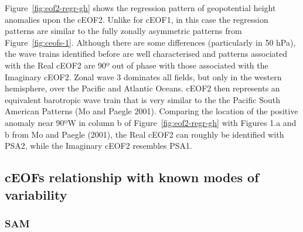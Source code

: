 \documentclass[smallextended]{svjour3}       %
\begin{document}
Figure~\ref{fig:eof2-regr-gh} shows the regression pattern of geopotential height anomalies upon the cEOF2. Unlike for cEOF1, in this case the regression patterns are similar to the fully zonally asymmetric patterns from Figure~\ref{fig:ceofs-1}. Although there are some differences (particularly in 50 hPa), the wave trains identified before are well characterised and patterns associated with the Real cEOF2 are 90º out of phase with those associated with the Imaginary cEOF2. Zonal wave 3 dominates all fields, but only in the western hemisphere, over the Pacific and Atlantic Oceans. cEOF2 then represents an equivalent barotropic wave train that is very similar to the the Pacific South American Patterns (Mo and Paegle 2001).
Comparing the location of the positive anomaly near 90ºW in column b of Figure~\ref{fig:eof2-regr-gh} with Figures 1.a and b from Mo and Paegle (2001), the Real cEOF2 can roughly be identified with PSA2, while the Imaginary cEOF2 resembles PSA1.

\hypertarget{other-variables}{%
\subsection{cEOFs relationship with known modes of variability}\label{other-variables}}

\hypertarget{sam}{%
\subsubsection{SAM}\label{sam}}
\end{document}

